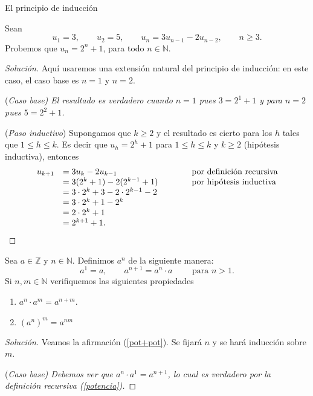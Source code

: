 \begin{section}{El principio de inducción}
\begin{ejemplo}
Sean $$u_1 = 3,\qquad u_2 = 5,\qquad u_n = 3u_{n-1}- 2u_{n-2},\qquad  n \ge 3.$$
Probemos que $u_n = 2^n + 1$, para todo $n \in  \mathbb N$.
\begin{proof}[Solución] Aquí usaremos una extensión natural del principio de inducción: en este caso, el caso base es $n=1$ y $n=2$.

\noindent(\it Caso  base\rm) El resultado es verdadero
cuando $n= 1$ pues $3 = 2^1+1$ y para $n=2$ pues $ 5 =2^2+1$.

\noindent ({\it Paso  inductivo}) Supongamos que $k \ge 2$ y el resultado  es cierto para los $h$ tales que  $1 \le h \le k$. Es decir que $u_h = 2^h+1$ para $1 \le h \le k$ y $k \ge 2$ (hipótesis inductiva), entonces
$$
\begin{matrix} u_{k+1} &= 3u_k -2u_{k-1} \hfill &\qquad &\text{por definición recursiva} \hfill \\
&= 3(2^k+1)-2(2^{k-1}+1) \hfill &\qquad &\text{por hipótesis inductiva}\hfill \\
&= 3\cdot 2^k+3-2\cdot 2^{k-1}-2 \hfill &\qquad & \\
&= 3\cdot 2^k+1- 2^{k} \hfill &\qquad & \\
&= 2\cdot 2^k+1 \hfill &\qquad & \\
&= 2^{k+1}+1. \hfill &\qquad & 
\end{matrix}
$$
\end{proof}
\end{ejemplo}


\begin{ejemplo}
Sea $a \in \mathbb Z$ y $n \in \mathbb N$. Definimos $a^n$ de la siguiente manera:
\begin{equation}\label{potencia}
a^1 = a, \qquad a^{n+1} = a^{n}\cdot a \qquad \text{ para $n >1$.}
\end{equation}
Si $n,m \in \mathbb N$ verifiquemos las siguientes propiedades


\begin{enumerate}[label=(\alph*)]
\item \label{pot+pot} $a^{n} \cdot a^m = a^{n+m}$.
\item \label{potpot} $(a^n)^m = a^{nm}$
\end{enumerate}
\begin{proof}[Solución] 
Veamos la afirmación (\ref{pot+pot}). Se fijará $n$ y se hará inducción sobre $m$. 

\noindent(\it Caso  base\rm) Debemos ver que $a^{n} \cdot a^1 = a^{n+1}$, lo cual es verdadero por la definición recursiva (\ref{potencia}). 


\end{proof}
\end{ejemplo}
\end{section}
